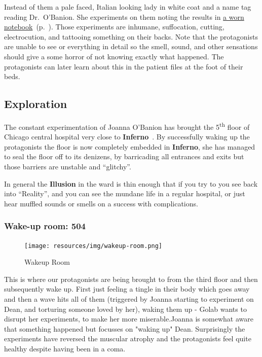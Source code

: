 \documentclass[bg-full]{resources/stylesheets/kult}
\begin{document}
Instead of them a pale faced, Italian looking lady in white coat and a name tag reading Dr.~O'Banion.  She experiments on them
noting the results in \hyperref[notebook]{a worn notebook}~(p.~\pageref{notebook}). Those experiments are inhumane, suffocation,
cutting, electrocution, and tattooing something on their backs. Note that the protagonists are unable to see or everything in
detail so the smell, sound, and other sensations should give a some horror of not knowing exactly what happened. The protagonists
can later learn about this in the patient files at the foot of their beds.

\subsection{Exploration}%
\label{sub:exploration}

The constant experimentation of Joanna O'Banion has brought the 5\textsuperscript{th} floor of Chicago
central hospital very close to \textbf{Inferno}~\cite[p.~314]{KULT:core}.  By successfully waking up the protagonists the floor
is now completely embedded in \textbf{Inferno}, she has managed to seal the floor off to its denizens, by barricading all
entrances and exits but those barriers are unstable and “glitchy”.

In general the \textbf{Illusion} in the ward is thin enough that if you try to  you see back
into “Reality”, and you can see the mundane life in a regular hospital, or just hear muffled sounds or smells on a success with
complications.

\subsubsection{Wake-up room: 504}%
\label{ssub:wake_up_room}

\begin{figure}[!htbp]
  \centering
  \texttt{[image: resources/img/wakeup-room.png]}%
  \caption{Wakeup Room}
\end{figure}

This is where our protagonists are being brought to from the third floor and then subsequently wake up. First just feeling a
tingle in their body which goes away and then a wave hits all of them (triggered by Joanna starting to experiment on Dean, and
torturing someone loved by her), waking them up - Golab wants to disrupt her experiments, to make her more miserable.Joanna is
somewhat aware that something happened but focusses on "waking up" Dean. Surprisingly the experiments have reversed the muscular
atrophy and the protagonists feel quite healthy despite having been in a coma.
\end{document}
